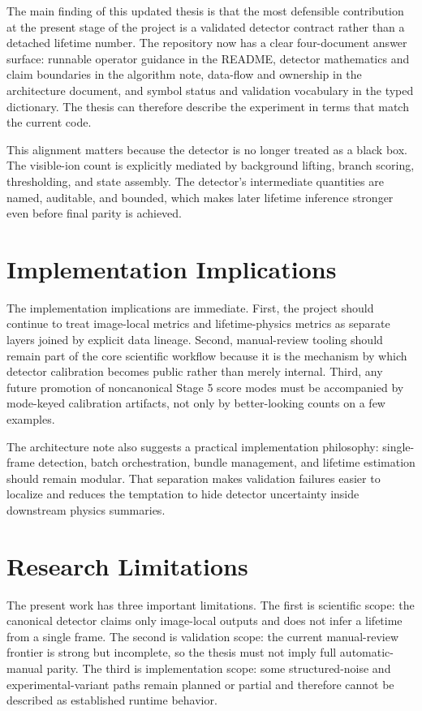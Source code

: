 \documentclass[12pt]{report}
\begin{document}
The main finding of this updated thesis is that the most defensible contribution at the present stage of the project is a validated detector contract rather than a detached lifetime number. The repository now has a clear four-document answer surface: runnable operator guidance in the README, detector mathematics and claim boundaries in the algorithm note, data-flow and ownership in the architecture document, and symbol status and validation vocabulary in the typed dictionary. The thesis can therefore describe the experiment in terms that match the current code.

This alignment matters because the detector is no longer treated as a black box. The visible-ion count is explicitly mediated by background lifting, branch scoring, thresholding, and state assembly. The detector's intermediate quantities are named, auditable, and bounded, which makes later lifetime inference stronger even before final parity is achieved.

\section{Implementation Implications}

The implementation implications are immediate. First, the project should continue to treat image-local metrics and lifetime-physics metrics as separate layers joined by explicit data lineage. Second, manual-review tooling should remain part of the core scientific workflow because it is the mechanism by which detector calibration becomes public rather than merely internal. Third, any future promotion of noncanonical Stage 5 score modes must be accompanied by mode-keyed calibration artifacts, not only by better-looking counts on a few examples.

The architecture note also suggests a practical implementation philosophy: single-frame detection, batch orchestration, bundle management, and lifetime estimation should remain modular. That separation makes validation failures easier to localize and reduces the temptation to hide detector uncertainty inside downstream physics summaries.

\section{Research Limitations}

The present work has three important limitations. The first is scientific scope: the canonical detector claims only image-local outputs and does not infer a lifetime from a single frame. The second is validation scope: the current manual-review frontier is strong but incomplete, so the thesis must not imply full automatic-manual parity. The third is implementation scope: some structured-noise and experimental-variant paths remain planned or partial and therefore cannot be described as established runtime behavior.
\end{document}
